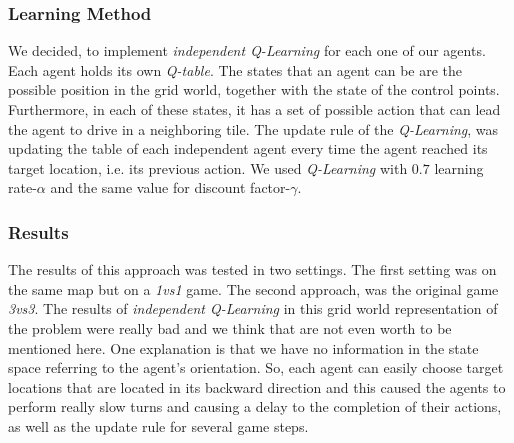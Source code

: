 \documentclass[conference]{IEEEtran}
\begin{document}
\subsubsection{Learning Method}
We decided, to implement \textit{independent Q-Learning} for each one of our agents. Each agent holds its own \textit{Q-table}. The states that an agent can be are the possible position in the grid world, together with the state of the control points. Furthermore, in each of these states, it has a set of possible action that can lead the agent to drive in a neighboring tile. The update rule of the \textit{Q-Learning}, was updating the table of each independent agent every time the agent reached its target location, i.e. its previous action. We used \textit{Q-Learning} with $0.7$ learning rate-$\alpha$ and the same value for discount factor-$\gamma$.

\subsubsection{Results}
The results of this approach was tested in two settings. The first setting was on the same map but on a \emph{1vs1} game. The second approach, was the original game \emph{3vs3}. The results of \textit{independent Q-Learning} in this grid world representation of the problem were really bad and we think that are not even worth to be mentioned here. One explanation is that we have no information in the state space referring to the agent's orientation. So, each agent can easily choose target locations that are located in its backward direction and this caused the agents to perform really slow turns and causing a delay to the completion of their actions, as well as the update rule for several game steps.
\end{document}
